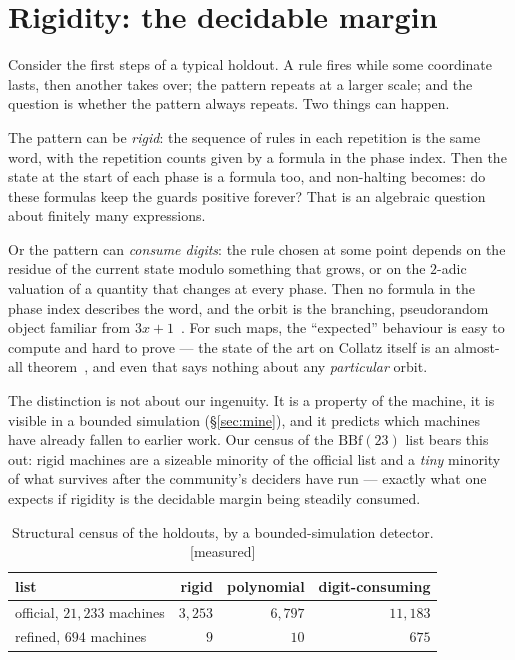 \documentclass[11pt,a4paper]{article}
\theoremstyle{plain}
\theoremstyle{definition}
\newcommand{\Meas}{\textcolor{linkc}{\textsf{[measured]}}}
\begin{document}
\section{Rigidity: the decidable margin}\label{sec:rigid}

Consider the first steps of a typical holdout. A rule fires while some
coordinate lasts, then another takes over; the pattern repeats at a
larger scale; and the question is whether the pattern always repeats.
Two things can happen.

The pattern can be \emph{rigid}: the sequence of rules in each repetition
is the same word, with the repetition counts given by a formula in the
phase index. Then the state at the start of each phase is a formula too,
and non-halting becomes: do these formulas keep the guards positive
forever? That is an algebraic question about finitely many expressions.

Or the pattern can \emph{consume digits}: the rule chosen at some point
depends on the residue of the current state modulo something that grows,
or on the $2$-adic valuation of a quantity that changes at every phase.
Then no formula in the phase index describes the word, and the orbit is
the branching, pseudorandom object familiar from
$3x+1$~\cite{lagarias}. For such maps, the ``expected'' behaviour is
easy to compute and hard to prove --- the state of the art on Collatz
itself is an almost-all theorem~\cite{tao}, and even that says nothing
about any \emph{particular} orbit.

The distinction is not about our ingenuity. It is a property of the
machine, it is visible in a bounded simulation (\S\ref{sec:mine}), and it
predicts which machines have already fallen to earlier work. Our census
of the $\mathrm{BBf}(23)$ list bears this out: rigid machines are a
sizeable minority of the official list and a \emph{tiny} minority of what
survives after the community's deciders have run --- exactly what one
expects if rigidity is the decidable margin being steadily consumed.

\begin{table}[h]
\centering\small
\begin{tabular}{lrrr}
\toprule
list & rigid & polynomial & digit-consuming\\
\midrule
official, $21{,}233$ machines & $3{,}253$ & $6{,}797$ & $11{,}183$\\
refined, $694$ machines & $9$ & $10$ & $675$\\
\bottomrule
\end{tabular}
\caption{Structural census of the holdouts, by a bounded-simulation
detector. \Meas}
\label{tab:census}
\end{table}
\end{document}
